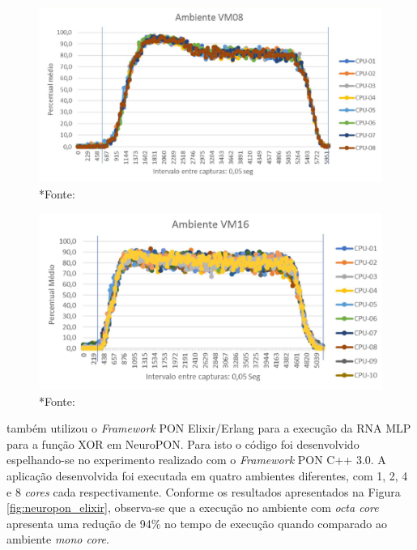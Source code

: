 \begin{figure}[!htb]
  \centering
  \begin{minipage}{.5\textwidth}
    \centering
    \includegraphics[width=\linewidth]{../figures/vm08.png}
    \smallskip
    *{Fonte: }
    \label{fig:vm08}
  \end{minipage}%
  \begin{minipage}{.5\textwidth}
    \centering
    \includegraphics[width=\linewidth]{../figures/vm16.png}
    \smallskip
    *{Fonte: }
    \label{fig:vm16}
  \end{minipage}
\end{figure}

\FloatBarrier

 também utilizou o \textit{Framework} PON
Elixir/Erlang para a execução da RNA MLP para a função XOR em NeuroPON. Para
isto o código foi desenvolvido espelhando-se no experimento realizado com o
\textit{Framework} PON C++ 3.0. A aplicação desenvolvida foi executada em quatro
ambientes diferentes, com 1, 2, 4 e 8 \textit{cores} cada respectivamente.
Conforme os resultados apresentados na Figura \ref{fig:neuropon_elixir},
observa-se que a execução no ambiente com \textit{octa core} apresenta uma
redução de 94\% no tempo de execução quando comparado ao ambiente \textit{mono
core}. 

